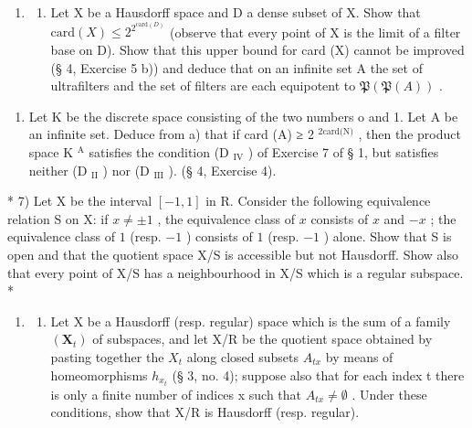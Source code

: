\begin{enumerate}
\def\labelenumi{\arabic{enumi})}
\setcounter{enumi}{5}
\tightlist
\item
  \begin{enumerate}
  \def\labelenumii{\alph{enumii})}
  \tightlist
  \item
    Let X be a Hausdorff space and D a dense subset of X. Show that \(\text{card}(X) \leqslant 2^{2^{\text{card}(D)}}\) (observe that every point of X is the limit of a filter base on D). Show that this upper bound for card (X) cannot be improved (§ 4, Exercise 5 b)) and deduce that on an infinite set A the set of ultrafilters and the set of filters are each equipotent to \(\mathfrak{P}(\mathfrak{P}(A))\) .
  \end{enumerate}
\end{enumerate}

\begin{enumerate}
\def\labelenumi{\alph{enumi})}
\setcounter{enumi}{1}
\tightlist
\item
  Let K be the discrete space consisting of the two numbers o and 1. Let A be an infinite set. Deduce from a) that if card (A) ≥ 2 \(^{2\text{card(N)}}\) , then the product space K \(^{\text{A}}\) satisfies the condition (D \(_{\text{IV}}\) ) of Exercise 7 of § 1, but satisfies neither (D \(_{\text{II}}\) ) nor (D \(_{\text{III}}\) ). (§ 4, Exercise 4).
\end{enumerate}

* 7) Let X be the interval \([-1, 1]\) in R. Consider the following equivalence relation S on X: if \(x \neq \pm 1\) , the equivalence class of \(x\) consists of \(x\) and \(-x\) ; the equivalence class of \(1\) (resp. \(-1\) ) consists of \(1\) (resp. \(-1\) ) alone. Show that S is open and that the quotient space X/S is accessible but not Hausdorff. Show also that every point of X/S has a neighbourhood in X/S which is a regular subspace. *

\begin{enumerate}
\def\labelenumi{\arabic{enumi})}
\setcounter{enumi}{7}
\tightlist
\item
  \begin{enumerate}
  \def\labelenumii{\alph{enumii})}
  \tightlist
  \item
    Let X be a Hausdorff (resp. regular) space which is the sum of a family \((\mathbf{X}_{t})\) of subspaces, and let X/R be the quotient space obtained by pasting together the \(X_{t}\) along closed subsets \(A_{tx}\) by means of homeomorphisms \(h_{x_{t}}\) (§ 3, no. 4); suppose also that for each index t there is only a finite number of indices x such that \(A_{tx} \neq \emptyset\) . Under these conditions, show that X/R is Hausdorff (resp. regular).
  \end{enumerate}
\end{enumerate}

